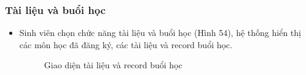 \subsubsection*{Tài liệu và buổi học}
\begin{itemize}
    \item Sinh viên chọn chức năng tài liệu và buổi học (Hình 54), hệ thống hiển thị các môn học đã đăng ký, các tài liệu và record buổi học. 
    \begin{figure}[H]
    \centering
    \setlength{\fboxsep}{2pt}     
    \setlength{\fboxrule}{0.5pt}   
    \caption{Giao diện tài liệu và record buổi học}
    \end{figure}
\end{itemize}
